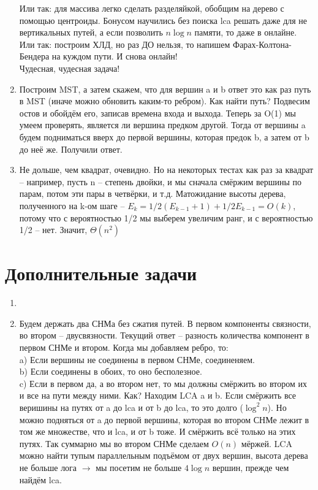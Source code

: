 \documentclass[12pt]{article}
\begin{document}
\begin{enumerate}
        Или так: для массива легко сделать разделяйкой, обобщим на дерево с помощью центроиды. Бонусом научились без поиска lca решать даже для не 
        вертикальных путей, а если позволить $n\log n$ памяти, то даже в онлайне. \\
        Или так: построим ХЛД, но раз ДО нельзя, то напишем Фарах-Колтона-Бендера на куждом пути. И снова онлайн! \\
        Чудесная, чудесная задача! \\
        \item Построим MST, а затем скажем, что для вершин a и b ответ это как раз путь в MST (иначе можно обновить каким-то ребром). Как найти 
        путь? Подвесим остов и обойдём его, записав времена входа и выхода. Теперь за O(1) мы умеем проверять, является ли вершина предком другой. 
        Тогда от вершины a будем подниматься вверх до первой вершины, которая предок b, а затем от b до неё же. Получили ответ. \\
        \item Не дольше, чем квадрат, очевидно. Но на некоторых тестах как раз за квадрат -- например, пусть n -- степень двойки, и мы сначала 
        смёржим вершины по парам, потом эти пары в четвёрки, и т.д. Матожидание высоты дерева, полученного на k-ом шаге -- $E_k = 1/2(E_{k - 1} + 1) + 
        1/2E_{k - 1} = O(k)$, потому что с вероятностью 1/2 мы выберем увеличим ранг, и с вероятностью 1/2 -- нет. Значит, $\Theta(n^2)$\\
    \end{enumerate}
    
    \section{Дополнительные задачи}
    
    \begin{enumerate}
        \setlength{\parskip}{0pt} 
        \setlength{\itemsep}{0pt} 
        \item ~\\
        \item Будем держать два СНМа без сжатия путей. В первом компоненты связности, во втором -- двусвязности. Текущий ответ -- разность количества компонент 
        в первом СНМе и втором. Когда мы добавляем ребро, то: \\
        a) Если вершины не соединены в первом СНМе, соединеняем. \\
        b) Если соединены в обоих, то оно бесполезное. \\
        c) Если в первом да, а во втором нет, то мы должны смёржить во втором их и все на пути между ними. Как? Находим LCA a и b. Если смёржить 
        все веришины на путях от a до lca и от b до lca, то это долго ($\log^2 n$). Но можно подняться от a до первой вершины, которая во втором СНМе лежит в том 
        же множестве, что и lca, и от b тоже. И смёржить всё только на этих путях. Так суммарно мы во втором СНМе сделаем $O(n)$ мёржей. LCA можно найти 
        тупым параллельным подъёмом от двух вершин, высота дерева не больше лога $\to$ мы посетим не больше $4\log n$ вершин, прежде чем найдём lca. \\
    \end{enumerate}
    
    
\end{document}
